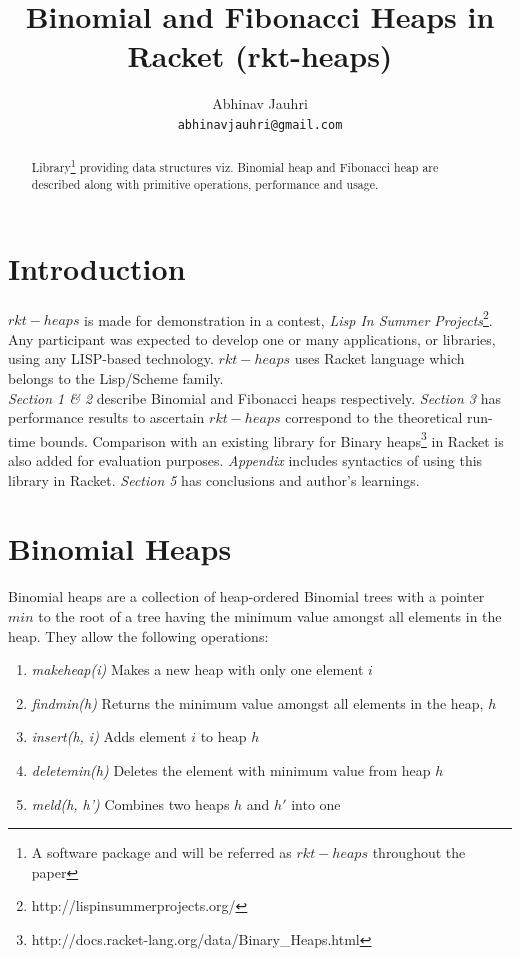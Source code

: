 \documentclass{llncs}
\title{Binomial and Fibonacci Heaps in Racket (rkt-heaps)}
\begin{document}
\author{
	Abhinav Jauhri\\
	\texttt{abhinavjauhri@gmail.com}\\
}

\maketitle

\begin{abstract}
	Library\footnote{A software package and will be referred as $rkt-heaps$ throughout the paper} providing data structures viz. Binomial heap \cite{vuillemin1978data} and Fibonacci heap\cite{fredman1987fibonacci} are described along with primitive operations, performance and usage. 
\end{abstract}

\section{Introduction}
$rkt-heaps$ is made for demonstration in a contest, \textit{Lisp In Summer Projects}\footnote{http://lispinsummerprojects.org/}. Any participant was expected to develop one or many applications, or libraries, using any LISP-based technology. $rkt-heaps$ uses Racket language which belongs to the Lisp/Scheme family. \\

\emph{Section 1 \& 2} describe Binomial and Fibonacci heaps respectively. \emph{Section 3} has performance results to ascertain $rkt-heaps$ correspond to the theoretical run-time bounds. Comparison with an existing library for Binary heaps\footnote{http://docs.racket-lang.org/data/Binary\_Heaps.html} in Racket is also added for evaluation purposes. \emph{Appendix} includes syntactics of using this library in Racket. \emph{Section 5} has conclusions and author's learnings.

\section{Binomial Heaps}
Binomial heaps are a collection of heap-ordered Binomial trees with a pointer $min$ to the root of a tree having the minimum value amongst all elements in the heap. They allow the following operations: \\

\begin{enumerate}
	\item \emph{makeheap(i)} Makes a new heap with only one element $i$
	\item \emph{findmin(h)} Returns the minimum value amongst all elements in the heap, $h$
	\item \emph{insert(h, i)} Adds element $i$ to heap $h$
	\item \emph{deletemin(h)} Deletes the element with minimum value from heap $h$
	\item \emph{meld(h, h')} Combines two heaps $h$ and $h'$ into one \\
\end{enumerate}
\end{document}
